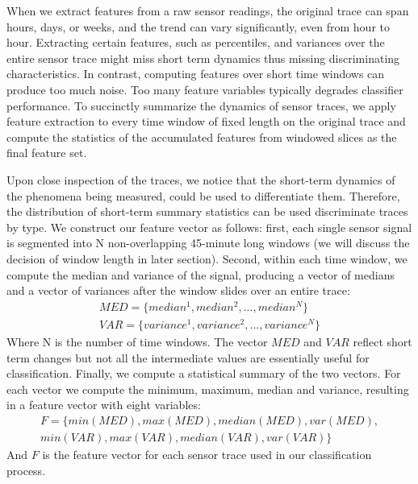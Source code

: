 When we extract features from a raw sensor readings, the original trace can span hours, days, or weeks, and
the trend can vary significantly, even from hour to hour. Extracting certain features, such as percentiles, and
variances over the entire sensor trace might miss  short term dynamics thus missing discriminating characteristics.
In contrast, computing features over short time windows can produce too much noise.  Too many  feature variables typically 
degrades classifier performance.
To succinctly summarize the dynamics of sensor traces, we apply feature extraction to every time window of fixed length on 
the original trace and compute the statistics of the accumulated features from windowed slices as the final feature set. 

Upon close inspection of the traces, we notice that the short-term dynamics of the phenomena being measured, could be used
to differentiate them.  Therefore, the distribution of short-term summary statistics can be used discriminate
traces by type.  We construct our feature vector as follows: first,
each single sensor signal is segmented into N
non-overlapping 45-minute long windows (we will discuss the decision of window length in later section). Second, within
each time window, we compute the median and variance of the signal, producing a vector of medians and a vector of
variances after the window slides over an entire trace: 
\begin{displaymath}
\begin{split}
MED = \{median^{1}, median^{2}, ..., median^{N}\}\\
VAR = \{variance^{1}, variance^{2}, ..., variance^{N}\}
\end{split}
\end{displaymath}
Where N is the number of time windows. The vector $MED$ and $VAR$ reflect short term changes but not all the intermediate values are essentially useful for classification. Finally, we compute a statistical summary of the two vectors.   For each vector we compute the minimum, maximum, median and variance, resulting in a feature vector with eight variables:
\begin{displaymath}
\begin{split}
F = \{min(MED), max(MED), median(MED), var(MED),\\
 min(VAR), max(VAR), median(VAR), var(VAR)\}
\end{split}
\end{displaymath}
And $F$ is the feature vector for each sensor trace used in our classification process.


